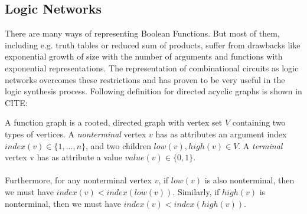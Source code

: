 \subsection{Logic Networks}

There are many ways of representing Boolean Functions. But most of them, including e.g. truth tables or reduced sum of products, suffer from drawbacks like exponential growth of size with the number of arguments and functions with exponential representations. The representation of combinational circuits as logic networks overcomes these restrictions and has proven to be very useful in the logic synthesis process. Following definition for directed acyclic graphs is shown in CITE:

\begin{definition}
	A function graph is a rooted, directed graph with vertex set $V$ containing two types of vertices. A \textit{nonterminal} vertex $v$ has as attributes an argument index $index(v) \in \{1, . . .,n\}$, and two children $low(v),high(v) \in V$. A \textit{terminal} vertex v has as attribute a value $value(v)\in\{0,1\}$.\\
	\\
	Furthermore, for any nonterminal vertex $v$, if $low(v)$ is also nonterminal, then we must have
	$index(v) < index(low(v))$. Similarly, if $high(v)$ is nonterminal, then we must have
	$index(v) < index(high(v))$.
\end{definition}

